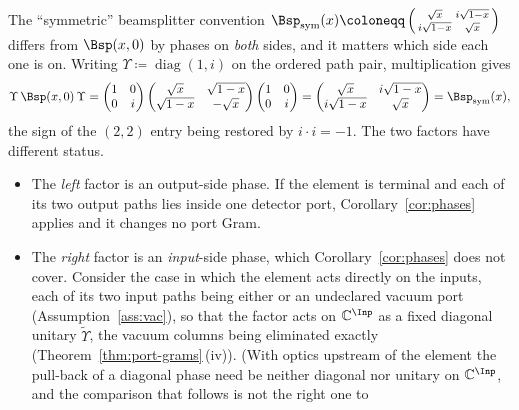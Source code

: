 \begin{remark}\label{rem:bsconv}
The ``symmetric'' beamsplitter convention
$\Bsp_{\mathrm{sym}}(x)\coloneqq
\left(\begin{smallmatrix}\sqrt x&i\sqrt{1-x}\\
i\sqrt{1-x}&\sqrt x\end{smallmatrix}\right)$ differs from $\Bsp(x,0)$ by
phases on \emph{both} sides, and it matters which side each one is on. Writing
$\Upsilon\coloneqq\operatorname{diag}(1,i)$ on the ordered path pair, multiplication
gives
\begin{equation}\label{eq:bssym}
  \Upsilon\,\Bsp(x,0)\,\Upsilon
  =\begin{pmatrix}1&0\\0&i\end{pmatrix}
   \begin{pmatrix}\sqrt x&\sqrt{1-x}\\ \sqrt{1-x}&-\sqrt x\end{pmatrix}
   \begin{pmatrix}1&0\\0&i\end{pmatrix}
  =\begin{pmatrix}\sqrt x& i\sqrt{1-x}\\ i\sqrt{1-x}&\sqrt x\end{pmatrix}
  =\Bsp_{\mathrm{sym}}(x) ,
\end{equation}
the sign of the $(2,2)$ entry being restored by $i\cdot i=-1$. The two factors
have different status.
\begin{itemize}[leftmargin=1.6em]
\item The \emph{left} factor is an output-side phase. If the element is
  terminal and each of its two output paths lies inside one detector port,
  Corollary~\ref{cor:phases} applies and it changes no port Gram.
\item The \emph{right} factor is an \emph{input}-side phase, which
  Corollary~\ref{cor:phases} does not cover. Consider the case in which the
  element acts directly on the inputs, each of its two input paths being
  either  or an undeclared vacuum port
  (Assumption~\ref{ass:vac}), so that the factor acts on
  $\mathbb{C}^{\Inp}$ as a fixed diagonal unitary $\widetilde\Upsilon$,
  the vacuum columns being eliminated exactly
  (Theorem~\ref{thm:port-grams}\,(iv)). (With optics upstream of the element the
  pull-back of a diagonal phase need be neither diagonal nor unitary on
  $\mathbb{C}^{\Inp}$, and the comparison that follows is not the right one to

\end{itemize}
\end{remark}
